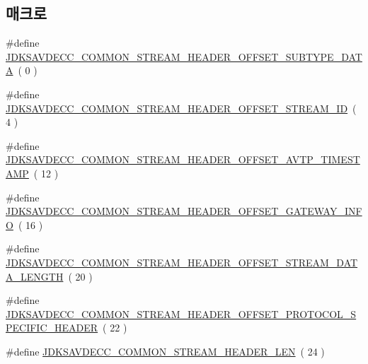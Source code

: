 \subsection*{매크로}
\begin{DoxyCompactItemize}
\item 
\#define \hyperlink{group__jdksavdecc__avtp__common__stream__header_ga3cb88fbbd71e98ec5d4d198058907b61}{J\+D\+K\+S\+A\+V\+D\+E\+C\+C\+\_\+\+C\+O\+M\+M\+O\+N\+\_\+\+S\+T\+R\+E\+A\+M\+\_\+\+H\+E\+A\+D\+E\+R\+\_\+\+O\+F\+F\+S\+E\+T\+\_\+\+S\+U\+B\+T\+Y\+P\+E\+\_\+\+D\+A\+TA}~( 0 )
\item 
\#define \hyperlink{group__jdksavdecc__avtp__common__stream__header_ga200678ec075c762133296947a5c8282f}{J\+D\+K\+S\+A\+V\+D\+E\+C\+C\+\_\+\+C\+O\+M\+M\+O\+N\+\_\+\+S\+T\+R\+E\+A\+M\+\_\+\+H\+E\+A\+D\+E\+R\+\_\+\+O\+F\+F\+S\+E\+T\+\_\+\+S\+T\+R\+E\+A\+M\+\_\+\+ID}~( 4 )
\item 
\#define \hyperlink{group__jdksavdecc__avtp__common__stream__header_ga0316b239e6f810f54ecc1b9fbff142f1}{J\+D\+K\+S\+A\+V\+D\+E\+C\+C\+\_\+\+C\+O\+M\+M\+O\+N\+\_\+\+S\+T\+R\+E\+A\+M\+\_\+\+H\+E\+A\+D\+E\+R\+\_\+\+O\+F\+F\+S\+E\+T\+\_\+\+A\+V\+T\+P\+\_\+\+T\+I\+M\+E\+S\+T\+A\+MP}~( 12 )
\item 
\#define \hyperlink{group__jdksavdecc__avtp__common__stream__header_ga1e85dbe5c3234fd49fe5b5faf9245b86}{J\+D\+K\+S\+A\+V\+D\+E\+C\+C\+\_\+\+C\+O\+M\+M\+O\+N\+\_\+\+S\+T\+R\+E\+A\+M\+\_\+\+H\+E\+A\+D\+E\+R\+\_\+\+O\+F\+F\+S\+E\+T\+\_\+\+G\+A\+T\+E\+W\+A\+Y\+\_\+\+I\+N\+FO}~( 16 )
\item 
\#define \hyperlink{group__jdksavdecc__avtp__common__stream__header_ga5a19626729691a021136abb562f42aa9}{J\+D\+K\+S\+A\+V\+D\+E\+C\+C\+\_\+\+C\+O\+M\+M\+O\+N\+\_\+\+S\+T\+R\+E\+A\+M\+\_\+\+H\+E\+A\+D\+E\+R\+\_\+\+O\+F\+F\+S\+E\+T\+\_\+\+S\+T\+R\+E\+A\+M\+\_\+\+D\+A\+T\+A\+\_\+\+L\+E\+N\+G\+TH}~( 20 )
\item 
\#define \hyperlink{group__jdksavdecc__avtp__common__stream__header_ga33984d105e956ebc70d9aa7852eb3244}{J\+D\+K\+S\+A\+V\+D\+E\+C\+C\+\_\+\+C\+O\+M\+M\+O\+N\+\_\+\+S\+T\+R\+E\+A\+M\+\_\+\+H\+E\+A\+D\+E\+R\+\_\+\+O\+F\+F\+S\+E\+T\+\_\+\+P\+R\+O\+T\+O\+C\+O\+L\+\_\+\+S\+P\+E\+C\+I\+F\+I\+C\+\_\+\+H\+E\+A\+D\+ER}~( 22 )
\item 
\#define \hyperlink{group__jdksavdecc__avtp__common__stream__header_ga615d40bf9d23486c5c9bacdc031fb492}{J\+D\+K\+S\+A\+V\+D\+E\+C\+C\+\_\+\+C\+O\+M\+M\+O\+N\+\_\+\+S\+T\+R\+E\+A\+M\+\_\+\+H\+E\+A\+D\+E\+R\+\_\+\+L\+EN}~( 24 )
\end{DoxyCompactItemize}
